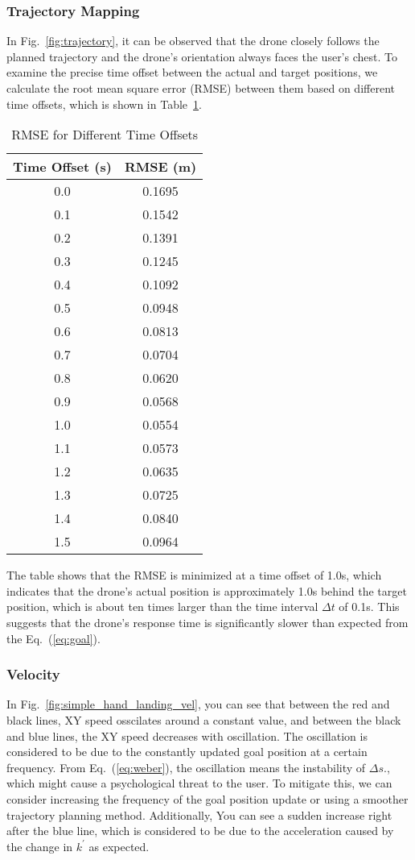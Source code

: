 \subsubsection{Trajectory Mapping}
In Fig.~\ref{fig:trajectory}, it can be observed that the drone closely follows the planned trajectory and the drone's orientation always faces the user's chest.
To examine the precise time offset between the actual and target positions, we calculate the root mean square error (RMSE) between them based on different time offsets, which is shown in Table~\ref{tab:rmse}.
\begin{table}[t]
  \centering
  \caption{RMSE for Different Time Offsets}
  \begin{tabular}{cc}
      \toprule
      Time Offset (s) & RMSE (m) \\
      \midrule
      0.0 & 0.1695 \\
      0.1 & 0.1542 \\
      0.2 & 0.1391 \\
      0.3 & 0.1245 \\
      0.4 & 0.1092 \\
      0.5 & 0.0948 \\
      0.6 & 0.0813 \\
      0.7 & 0.0704 \\
      0.8 & 0.0620 \\
      0.9 & 0.0568 \\
      1.0 & 0.0554 \\
      1.1 & 0.0573 \\
      1.2 & 0.0635 \\
      1.3 & 0.0725 \\
      1.4 & 0.0840 \\
      1.5 & 0.0964 \\
      \bottomrule
  \end{tabular}
  \label{tab:rmse}
\end{table}
The table shows that the RMSE is minimized at a time offset of 1.0s, which indicates that the drone's actual position is approximately 1.0s behind the target position,
which is about ten times larger than the time interval $\Delta t$ of 0.1s.
This suggests that the drone's response time is significantly slower than expected from the Eq.~(\ref{eq:goal}).

\subsubsection{Velocity}
In Fig.~\ref{fig:simple_hand_landing_vel},
you can see that between the red and black lines, XY speed osscilates around a constant value, and between the black and blue lines, the XY speed decreases with oscillation.
The oscillation is considered to be due to the constantly updated goal position at a certain frequency.
From Eq.~(\ref{eq:weber}), the oscillation means the instability of $\Delta s$.,
which might cause a psychological threat to the user.
To mitigate this, we can consider increasing the frequency of the goal position update or using a smoother trajectory planning method.
Additionally, You can see a sudden increase right after the blue line, which is considered to be due to the acceleration caused by the change in $k^\prime$ as expected.

